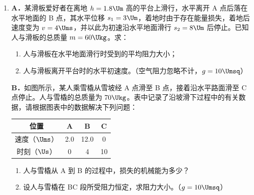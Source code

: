 \documentclass[\gkver]{gaokaozhenti}
\begin{document}
\begin{enumerate}
{（2）匀速；$1.937$。

（3）加速度逐渐减小的加速；匀速。

（4）图线 1 反映速度不随时间变化，图线 5 反映速度随时间继续增大（或图线 1 反映纸杯做匀速运动，图线 5 反映纸杯依然在做加速度减小的加速运动）。
}

\item
\textbf{A．}某滑板爱好者在离地 $h=1.8\Um$ 高的平台上滑行，水平离开 A 点后落在水平地面的 B 点，其水平位移 $s_{1}=3\Um$，着地时由于存在能量损失，着地后速度变为 $v=4\Ums$，并以此为初速沿水平地面滑行 $s_{2}=8\Um$ 后停止。已知人与滑板的总质量 $m=60\Ukg$。求：

\begin{enumerate}
	\item
	人与滑板在水平地面滑行时受到的平均阻力大小；
	\item
	人与滑板离开平台时的水平初速度。（空气阻力忽略不计，$g=10\Umsq$）
\end{enumerate}

\onepicture[align=right, w=7.71cm]{}

\textbf{B．}如图所示，某人乘雪橇从雪坡经 A 点滑至 B 点，接着沿水平路面滑至 C 点停止。人与雪橇的总质量为 $70\Ukg$。表中记录了沿坡滑下过程中的有关数据，请根据图表中的数据解决下列问题：

\begin{center}
\begin{tabular}{|c|c|c|c|}
\hline
位置 & A & B & C \\ \hline
速度（$\Ums$） & 2.0 & 12.0 & 0 \\ \hline
时刻（$\Us$） & 0 & 4 & 10 \\ \hline
\end{tabular}
\end{center}

\begin{enumerate}
	\item
	人与雪橇从 A 到 B 的过程中，损失的机械能为多少？
	\item
	设人与雪橇在 BC 段所受阻力恒定，求阻力大小。（$g=10\Umsq$）
\end{enumerate}

\onepicture[align=right, w=8.09cm]{}

\end{enumerate}
\end{document}
